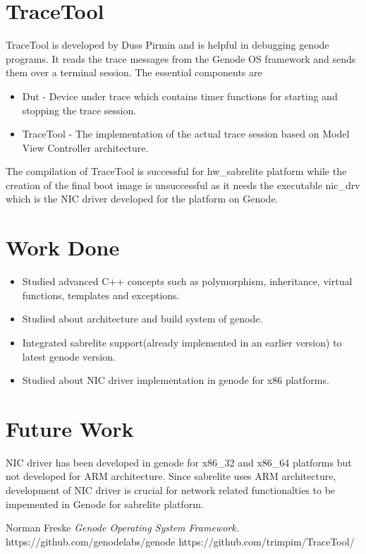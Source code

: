 \documentclass[12pt]{article}
\theoremstyle{plain}
\begin{document}
\section*{TraceTool}
TraceTool is developed by Duss Pirmin and is helpful in debugging genode programs. It reads the trace messages from the Genode OS framework and sends them over a terminal session. The essential components are
\begin{itemize}
\item Dut - Device under trace which contains timer functions for starting and stopping the trace session.
\item TraceTool - The implementation of the actual trace session based on Model View Controller architecture.
\end{itemize}
The compilation of TraceTool is successful for hw\_sabrelite platform while the creation of the final boot image is unsuccessful as it needs the executable nic\_drv which is the NIC driver developed for the platform on Genode.
\section*{Work Done}
\begin{itemize}
\item Studied advanced C++ concepts such as polymorphism, inheritance, virtual functions, templates and exceptions.
\item Studied about architecture and build system of genode.
\item Integrated sabrelite support(already implemented in an earlier version) to latest genode version.
\item Studied about NIC driver implementation in genode for x86 platforms.
\end{itemize}
\section*{Future Work}
NIC driver has been developed in genode for x86\_32 and x86\_64 platforms but not developed for ARM architecture. Since sabrelite uses ARM architecture, development of NIC driver is crucial for network related functionalties to be impemented in Genode for sabrelite platform.
\newpage
\begin{thebibliography}{9}

  Norman Freske
  \emph{Genode Operating System Framework.}
  https://github.com/genodelabs/genode
  https://github.com/trimpim/TraceTool/
\end{thebibliography}
\end{document}
